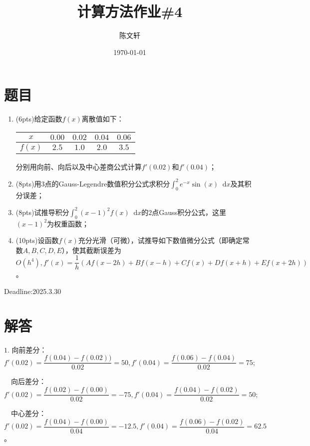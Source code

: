 \documentclass[cn,hazy,green,11pt,normal]{elegantnote}
\title{计算方法作业\#4}
\author{陈文轩}
\institute{KFRC}
\date{\today}
\newcommand*{\diff}{\mathop{}\!\mathrm{d}}
\begin{document}
\maketitle


\section{题目}
    \begin{enumerate}
        \item (6pts)给定函数$f(x)$离散值如下：
            \begin{table}[H]
                \begin{center}
                    \begin{tabular}{|c|c|c|c|c|}
                    \hline
                    $x$ & $0.00$ & $0.02$ & $0.04$ & $0.06$ \\
                    \hline
                    $f(x)$ & $2.5$ & $1.0$ & $2.0$ & $3.5$ \\
                    \hline
                    \end{tabular}
                \end{center}
            \end{table}
            分别用向前、向后以及中心差商公式计算$f'(0.02)$和$f'(0.04)$；
        \item (8pts)用$3$点的Gauss-Legendre数值积分公式求积分$\int_0^2 e^{-x}\sin(x)\diff x$及其积分误差；
        \item (8pts)试推导积分$\int_0^2 (x-1)^2 f(x)\diff x$的$2$点Gauss积分公式，这里$(x-1)^2$为权重函数；
        \item (10pts)设函数$f(x)$充分光滑（可微），试推导如下数值微分公式（即确定常数$A,B,C,D,E$），使其截断误差为$O(h^4),f'(x)=\dfrac1h (Af(x-2h)+Bf(x-h)+Cf(x)+Df(x+h)+Ef(x+2h))$。

    \end{enumerate}

    Deadline:2025.3.30

\section{解答}

    $1.\,\,$向前差分：$f'(0.02)=\dfrac{f(0.04)-f(0.02))}{0.02}=50,f'(0.04)=\dfrac{f(0.06)-f(0.04)}{0.02}=75;$

    $\quad$向后差分：$f'(0.02)=\dfrac{f(0.02)-f(0.00)}{0.02}=-75,f'(0.04)=\dfrac{f(0.04)-f(0.02)}{0.02}=50;$

    $\quad$中心差分：$f'(0.02)=\dfrac{f(0.04)-f(0.00)}{0.04}=-12.5,f'(0.04)=\dfrac{f(0.06)-f(0.02)}{0.04}=62.5$。
\end{document}
